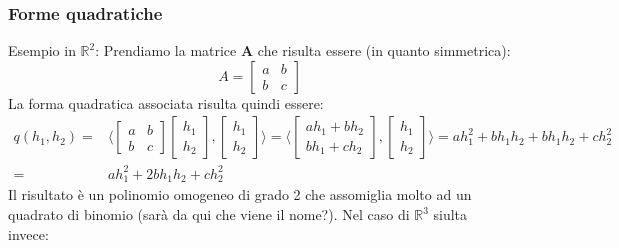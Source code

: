 \subsubsection{Forme quadratiche}
Esempio in $\mathbb{R}^2$: Prendiamo la matrice $\mathbf{A}$ che risulta essere 
(in quanto simmetrica):
\begin{equation*}
	A =
	\begin{bmatrix}
		a & b\\
		b & c
	\end{bmatrix}
\end{equation*}
La forma quadratica associata risulta quindi essere:
\begin{align*}
	q(h_1, h_2) =&
	\langle 
	\begin{bmatrix}
		a & b\\
		b & c
	\end{bmatrix}
	\begin{bmatrix}
		h_1\\
		h_2
	\end{bmatrix},
	\begin{bmatrix}
		h_1\\
		h_2
	\end{bmatrix}
	\rangle = 
	\langle
	\begin{bmatrix}
		ah_1 + bh_2\\
		bh_1 + ch_2
	\end{bmatrix},
	\begin{bmatrix}
		h_1\\
		h_2
	\end{bmatrix}
	\rangle =
	ah_1^2 + bh_1h_2 + bh_1h_2 + ch_2^2 \\[5pt]
	=& ah_1^2 + 2bh_1h_2 + ch_2^2
\end{align*}
Il risultato è un polinomio omogeneo di grado 2 che assomiglia molto ad un 
quadrato di binomio (sarà da qui che viene il nome?). Nel caso di 
$\mathbb{R}^3$ siulta invece:
